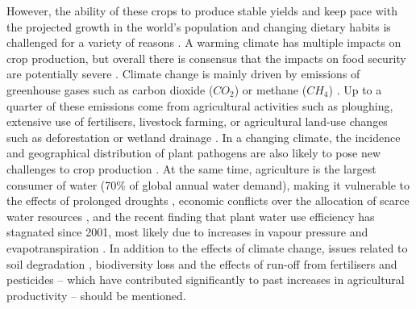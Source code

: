 However, the ability of these crops to produce stable yields and keep pace with the projected growth in the world's population and changing dietary habits is challenged for a variety of reasons \citep{tilman_global_2011}. A warming climate has multiple impacts on crop production, but overall there is consensus that the impacts on food security are potentially severe \citep{schmidhuber_global_2007,godfray_food_2010}. Climate change is mainly driven by emissions of greenhouse gases such as carbon dioxide ($CO_2$) or methane ($CH_4$) \citep{ipcc_summary_2023}. Up to a quarter of these emissions come from agricultural activities such as ploughing, extensive use of fertilisers, livestock farming, or agricultural land-use changes such as deforestation or wetland drainage \citep{laborde_agricultural_2021}. In a changing climate, the incidence and geographical distribution of plant pathogens are also likely to pose new challenges to crop production \citep{burdon_climate_2020}. At the same time, agriculture is the largest consumer of water (70\% of global annual water demand), making it vulnerable to the effects of prolonged droughts \citep{meza_global-scale_2020}, economic conflicts over the allocation of scarce water resources \citep{rosa_global_2020}, and the recent finding that plant water use efficiency has stagnated since 2001, most likely due to increases in vapour pressure and evapotranspiration \citep{li_global_2023}. In addition to the effects of climate change, issues related to soil degradation \citep{bindraban_assessing_2012}, biodiversity loss \citep{lanz_expansion_2018, abdi_biodiversity_2021} and the effects of run-off from fertilisers and pesticides -- which have contributed significantly to past increases in agricultural productivity \citep{pingali_green_2012} -- should be mentioned.

